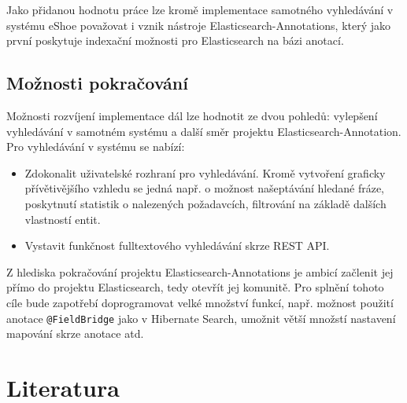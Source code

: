 \documentclass[11pt,oneside]{fithesis2}
\begin{document}
Jako přidanou hodnotu práce lze kromě implementace samotného vyhledávání v systému eShoe považovat i vznik nástroje Elasticsearch-Annotations, který jako první poskytuje indexační možnosti pro Elasticsearch na bázi anotací.

\section{Možnosti pokračování}
Možnosti rozvíjení implementace dál lze hodnotit ze dvou pohledů: vylepšení vyhledávání v samotném systému a další směr projektu Elasticsearch-Annotation. Pro vyhledávání v systému se nabízí:
\begin{itemize}
	\item Zdokonalit uživatelské rozhraní pro vyhledávání. Kromě vytvoření graficky přívětivějšího vzhledu se jedná např. o možnost našeptávání hledané fráze, poskytnutí statistik o nalezených požadavcích, filtrování na základě dalších vlastností entit.
	\item Vystavit funkčnost fulltextového vyhledávání skrze REST API.
\end{itemize}

Z hlediska pokračování projektu Elasticsearch-Annotations je ambicí začlenit jej přímo do projektu Elasticsearch, tedy otevřít jej komunitě. Pro splnění tohoto cíle bude zapotřebí doprogramovat velké množství funkcí, např. možnost použití anotace \texttt{@FieldBridge} jako v Hibernate Search, umožnit větší množstí nastavení mapování skrze anotace atd.



\printindex

\begingroup
\def\tmpchapter{0}
\renewcommand{\chaptername}{}
\renewcommand{\thechapter}{}
\chapter{Literatura}
\renewcommand{\chapter}[2]{}%
\end{document}
